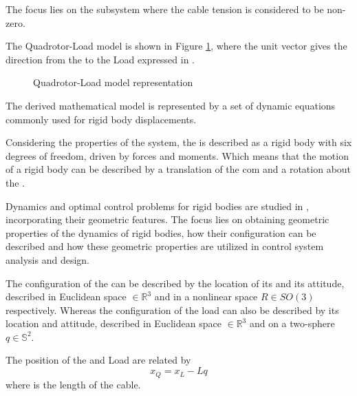 The focus lies on the subsystem where the cable tension is considered to be non-zero. 

The Quadrotor-Load model is shown in Figure \ref{fig:QRLmodel}, where the unit vector  gives the direction from the  to the Load expressed in \BF.

\begin{figure}[h!]
	\centering
	\caption{Quadrotor-Load model representation\label{fig:QRLmodel}}
\end{figure}		

The derived mathematical model is represented by a set of dynamic equations commonly used for rigid body displacements. 

Considering the properties of the system, the  is described as a rigid body with six degrees of freedom, driven by forces and moments. Which means that the motion of a rigid body can be described by a translation of the \acf{com} and a rotation about the . 

Dynamics and optimal control problems for rigid bodies are studied in \cite{Lee2008}, incorporating their geometric features. The focus lies on obtaining geometric properties of the dynamics of rigid bodies, how their configuration can be described and how these geometric properties are utilized in control system analysis and design. 

The configuration of the  can be described by the location of its  and its attitude, described in Euclidean space $\in \mathbb{R}^3 $ and in a nonlinear space $R\in SO(3) $ respectively. Whereas the configuration of the load can also be described by its location and attitude, described in Euclidean space $\in \mathbb{R}^3 $ and on a two-sphere $ q\in \mathbb{S}^2 $.

The position of the  and Load are related by
\begin{equation}\label{eq:xQ2xL}
x_Q=x_L-Lq
\end{equation}
where  is the length of the cable.

